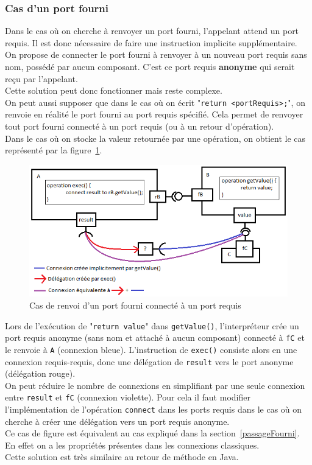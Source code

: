 \documentclass[11pt,a4paper,openany,oneside]{book}
\begin{document}
\subsubsection{Cas d'un port fourni}
Dans le cas où on cherche à renvoyer un port fourni, l'appelant attend un port requis. Il est donc nécessaire de faire une instruction implicite supplémentaire. \\
On propose de connecter le port fourni à renvoyer à un nouveau port requis sans nom, possédé par aucun composant. C'est ce port requis \textbf{anonyme} qui serait reçu par l'appelant.\\
Cette solution peut donc fonctionner mais reste complexe.\\
On peut aussi supposer que dans le cas où on écrit "\texttt{return <portRequis>;}", on renvoie en réalité le port fourni au port requis spécifié. Cela permet de renvoyer tout port fourni connecté à un port requis (ou à un retour d'opération).\\
Dans le cas où on stocke la valeur retournée par une opération, on obtient le cas représenté par la figure~\ref{renvoiFourni}.\\
\begin{figure}[H]
\centering
\includegraphics[scale=0.7, keepaspectratio=true]{renvoiFourni.png}
\caption{Cas de renvoi d'un port fourni connecté à un port requis}
\label{renvoiFourni}
\end{figure}
Lors de l'exécution de "\texttt{return value}" dans \texttt{getValue()}, l'interpréteur crée un port requis anonyme (sans nom et attaché à aucun composant) connecté à \texttt{fC} et le renvoie à \texttt{A} (connexion bleue). L'instruction de \texttt{exec()} consiste alors en une connexion requis-requis, donc une délégation de \texttt{result} vers le port anonyme (délégation rouge).\\
On peut réduire le nombre de connexions en simplifiant par une seule connexion entre \texttt{result} et \texttt{fC} (connexion violette). Pour cela il faut modifier l'implémentation de l'opération \texttt{connect} dans les ports requis dans le cas où on cherche à créer une délégation vers un port requis anonyme.\\
Ce cas de figure est équivalent au cas expliqué dans la section~\ref{passageFourni}. En effet on a les propriétés présentes dans les connexions classiques.\\
Cette solution est très similaire au retour de méthode en Java.
\end{document}
